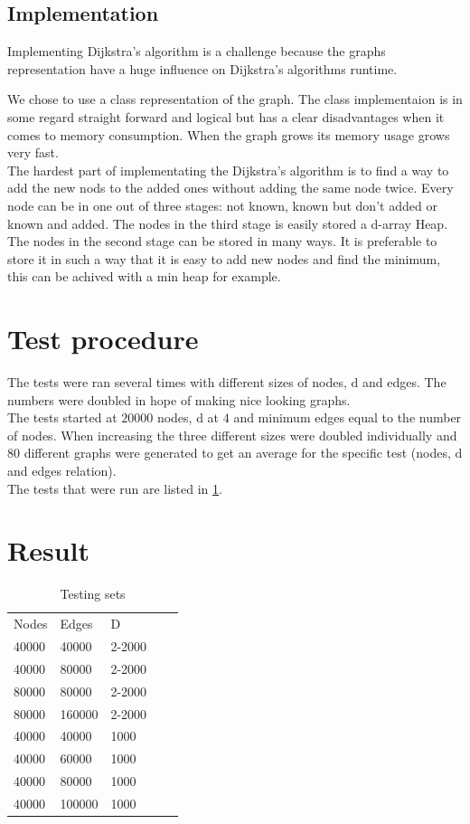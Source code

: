 \documentclass[paper=a4, fontsize=11pt]{scrartcl}
\numberwithin{equation}{section}		%
\numberwithin{figure}{section}			%
\numberwithin{table}{section}				%
\begin{document}
\subsection{Implementation}
Implementing Dijkstra’s algorithm is a challenge because the graphs representation have a huge influence on Dijkstra’s algorithms runtime.

 We chose to use a class representation of the graph. The class implementaion is in some regard straight forward and logical but has a clear disadvantages when it comes to memory consumption. When the graph grows its memory usage grows very fast.
\\

The hardest part of implementating the Dijkstra’s algorithm is to find a way to add the new nods to the added ones without adding the same node twice. Every node can be in one out of three stages: not known, known but don't added or known and added. The nodes in the third stage is easily stored a d-array Heap. The nodes in the second stage can be stored in many ways. It is preferable to store it in such a way that it is easy to add new nodes and find the minimum, this can be achived with a min heap for example. 


\section{Test procedure}
The tests were ran several times with different sizes of nodes, d and edges.
The numbers were doubled in hope of making nice looking graphs.
\\

The tests started at $20000$ nodes, d at $4$ and minimum edges equal to the number of nodes. When increasing the three different sizes were doubled individually and $80$ different graphs were generated to get an average for the specific test (nodes, d and edges relation).
\\

The tests that were run are listed in \ref{Testing sets}.
\section{Result}
\begin{table}[]
\centering
\caption{Testing sets}
\label{Testing sets}
\begin{tabular}{lllll}
Nodes & Edges & D \\
40000 & 40000 & 2-2000 \\
40000 & 80000 & 2-2000 \\
80000 & 80000 & 2-2000 \\
80000 & 160000 & 2-2000 \\
40000 & 40000 & 1000 \\
40000 & 60000 & 1000 \\
40000 & 80000 & 1000 \\
40000 & 100000 & 1000 \\
\end{tabular}
\end{table}
\end{document}

